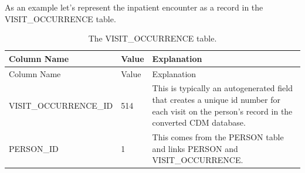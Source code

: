 \documentclass[]{book}
\begin{document}
As an example let's represent the inpatient encounter as a record in the
VISIT\_OCCURRENCE table.

\begin{longtable}[]{@{}lll@{}}
\caption{\label{tab:visitOccurrence} The VISIT\_OCCURRENCE
table.}\tabularnewline
\toprule
\begin{minipage}[b]{0.25\columnwidth}\raggedright\strut
Column Name\strut
\end{minipage} & \begin{minipage}[b]{0.17\columnwidth}\raggedright\strut
Value\strut
\end{minipage} & \begin{minipage}[b]{0.49\columnwidth}\raggedright\strut
Explanation\strut
\end{minipage}\tabularnewline
\midrule
\endfirsthead
\toprule
\begin{minipage}[b]{0.25\columnwidth}\raggedright\strut
Column Name\strut
\end{minipage} & \begin{minipage}[b]{0.17\columnwidth}\raggedright\strut
Value\strut
\end{minipage} & \begin{minipage}[b]{0.49\columnwidth}\raggedright\strut
Explanation\strut
\end{minipage}\tabularnewline
\midrule
\endhead
\begin{minipage}[t]{0.25\columnwidth}\raggedright\strut
VISIT\_OCCURRENCE\_ID\strut
\end{minipage} & \begin{minipage}[t]{0.17\columnwidth}\raggedright\strut
514\strut
\end{minipage} & \begin{minipage}[t]{0.49\columnwidth}\raggedright\strut
This is typically an autogenerated field that creates a unique id number
for each visit on the person's record in the converted CDM
database.\strut
\end{minipage}\tabularnewline
\begin{minipage}[t]{0.25\columnwidth}\raggedright\strut
PERSON\_ID\strut
\end{minipage} & \begin{minipage}[t]{0.17\columnwidth}\raggedright\strut
1\strut
\end{minipage} & \begin{minipage}[t]{0.49\columnwidth}\raggedright\strut
This comes from the PERSON table and links PERSON and
VISIT\_OCCURRENCE.\strut
\end{minipage}\tabularnewline

\end{longtable}
\end{document}
